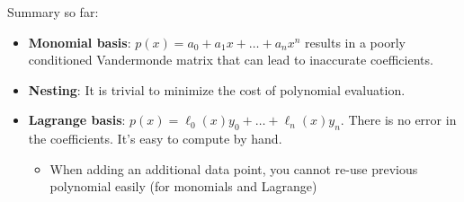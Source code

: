 \documentclass[10pt]{beamer}
\begin{document}
\begin{frame}{Summary so far:}
\begin{itemize}
  
   \item \textbf{Monomial basis}: $p(x) = a_0 + a_1 x +\dots+a_n x^n$ results in a poorly conditioned Vandermonde matrix that can lead to inaccurate coefficients.\bigskip

  \item \textbf{Nesting}: It is trivial to minimize the cost of polynomial evaluation. \bigskip
  
  \item \textbf{Lagrange basis}: $p(x) = \ell_0(x) y_0 + \dots + \ell_n(x) y_n$. There is no error in the coefficients. It's easy to compute by hand.  \bigskip

  \begin{itemize}
    \item When adding an additional data point, you cannot re-use previous polynomial easily (for monomials and Lagrange)
  \end{itemize}

\end{itemize}
\end{frame}
\end{document}
